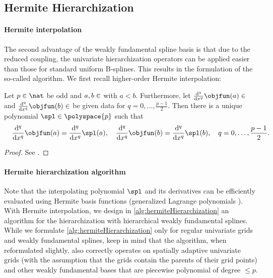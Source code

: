 \subsection{Hermite Hierarchization}
\label{sec:455hermiteHierarchization}

\paragraph{Hermite interpolation}

The second advantage of the weakly fundamental spline basis
is that due to the reduced coupling,
the univariate hierarchization operators can be applied easier
than those for standard uniform B-splines.
This results in the formulation of the so-called
 algorithm.
We first recall higher-order Hermite interpolation:

\begin{lemma}
  \label{lemma:hermiteInterpolation}
  Let $p \in \nat$ be odd and $a, b \in \real$ with $a < b$.
  Furthermore, let
  $\frac{\diff^q}{\dx^q} \objfun(a) \in \real$ and
  $\frac{\diff^q}{\dx^q} \objfun(b) \in \real$ be given data
  for $q = 0, \dotsc, \frac{p-1}{2}$.
  Then there is a unique polynomial $\spl \in \polyspace{p}$ such that
  \begin{equation}
    \frac{\diff^q}{\dx^q} \objfun(a)
    = \frac{\diff^q}{\dx^q} \spl(a),\quad
    \frac{\diff^q}{\dx^q} \objfun(b)
    = \frac{\diff^q}{\dx^q} \spl(b),\quad
    q = 0, \dotsc, \frac{p-1}{2}.
    \hspace*{-10mm}
  \end{equation}
\end{lemma}

\begin{proof}
  See \cite{Freund07Stoer}.
\end{proof}

\paragraph{Hermite hierarchization algorithm}

Note that the interpolating polynomial $\spl$ and its derivatives can be
efficiently evaluated using Hermite basis functions
(generalized Lagrange polynomials \cite{Freund07Stoer}).
With Hermite interpolation, we design
in \cref{alg:hermiteHierarchization} an algorithm
for the hierarchization with hierarchical weakly fundamental splines.
While we formulate \cref{alg:hermiteHierarchization}
only for regular univariate grids and weakly fundamental splines,
keep in mind that the algorithm, when reformulated slightly,
also correctly operates
on spatially adaptive univariate grids
(with the assumption that the grids contain the parents of their grid points)
and other weakly fundamental bases that are
piecewise polynomial of degree $\le p$.

